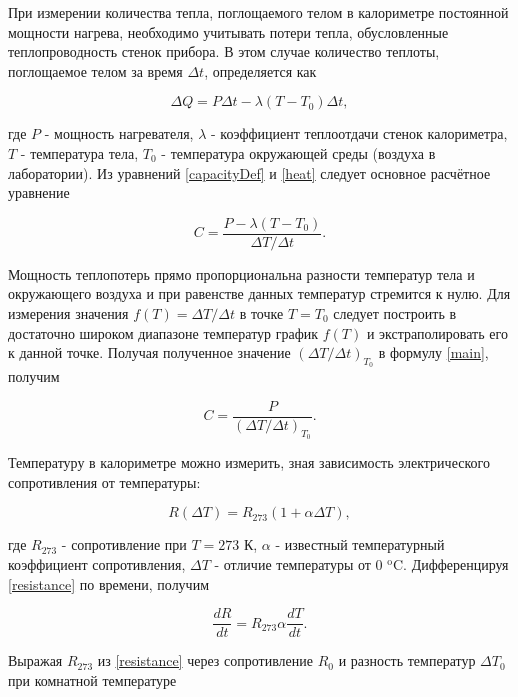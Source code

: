 \documentclass[a4paper,12pt]{article} %
\begin{document}
При измерении количества тепла, поглощаемого телом в калориметре постоянной мощности нагрева, необходимо учитывать потери тепла, обусловленные теплопроводность стенок прибора. В этом случае количество теплоты, поглощаемое телом за время $\Delta t$, определяется как

\begin{equation}
    \Delta Q = P\Delta t - \lambda(T - T_0)\Delta t,
    \label{heat}
\end{equation}

где $P$ - мощность нагревателя, $\lambda$ - коэффициент теплоотдачи стенок калориметра, $T$ - температура тела, $T_0$ - температура окружающей среды (воздуха в лаборатории). Из уравнений \eqref{capacityDef} и \eqref{heat} следует основное расчётное уравнение

\begin{equation}
    C = \frac{P - \lambda(T - T_0)}{\Delta T / \Delta t}.
    \label{main}
\end{equation}

Мощность теплопотерь прямо пропорциональна разности температур тела и окружающего воздуха и при равенстве данных температур стремится к нулю. Для измерения значения $f(T) = \Delta T / \Delta t$ в точке $T = T_0$ следует построить в достаточно широком диапазоне температур график $f(T)$ и экстраполировать его к данной точке. Получая полученное значение $(\Delta T / \Delta t)_{T_0}$ в формулу \eqref{main}, получим

\begin{equation}
    C = \frac{P}{(\Delta T / \Delta t)_{T_0}}.
\end{equation}

Температуру в калориметре можно измерить, зная зависимость электрического сопротивления от температуры: 

\begin{equation}
    R(\Delta T) = R_{273}(1 + \alpha \Delta T),
    \label{resistance}
\end{equation}

где $R_{273}$ - сопротивление при $T = 273$ К, $\alpha$ - известный температурный коэффициент сопротивления, $\Delta T$ - отличие температуры от 0 $^\text{o}$C. Дифференцируя \eqref{resistance} по времени, получим 

\begin{equation}
    \frac{dR}{dt} = R_{273}\alpha\frac{dT}{dt}.
    \label{timeDif}
\end{equation}

Выражая $R_{273}$ из \eqref{resistance} через сопротивление $R_0$ и разность температур $\Delta T_0$ при комнатной температуре
\end{document}
